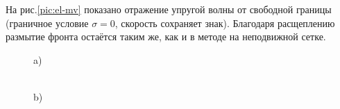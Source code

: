 На рис.\ref{pic:el-mv} показано отражение упругой волны от свободной границы (граничное условие $\sigma = 0$,       скорость сохраняет знак). Благодаря расщеплению размытие фронта остаётся таким же, как и в методе на неподвижной сетке.

\begin{figure}
\begin{minipage}[h]{0.47\linewidth}
 a) \\
\end{minipage}
\hfill
\begin{minipage}[h]{0.47\linewidth}
 \\b)

\end{minipage}
\end{figure}
